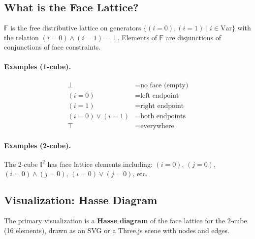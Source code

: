 \documentclass[11pt,a4paper]{article}
\begin{document}
\subsection{What is the Face Lattice?}

$\mathbb{F}$ is the free distributive lattice on generators
$\{(i=0), (i=1) \mid i \in \mathrm{Var}\}$ with the relation $(i=0)\wedge(i=1)=\bot$.
Elements of $\mathbb{F}$ are disjunctions of conjunctions of face constraints.

\paragraph{Examples (1-cube).}
\begin{align*}
  \bot &= \text{no face (empty)} \\
  (i=0) &= \text{left endpoint} \\
  (i=1) &= \text{right endpoint} \\
  (i=0)\vee(i=1) &= \text{both endpoints} \\
  \top &= \text{everywhere}
\end{align*}

\paragraph{Examples (2-cube).}
The 2-cube $\mathbb{I}^2$ has face lattice elements including:
$(i=0)$, $(j=0)$, $(i=0)\wedge(j=0)$, $(i=0)\vee(j=0)$, etc.

\subsection{Visualization: Hasse Diagram}

The primary visualization is a \textbf{Hasse diagram} of the face lattice for
the 2-cube (16 elements), drawn as an SVG or a Three.js scene with nodes and
edges.

\begin{center}
\end{center}
\end{document}
